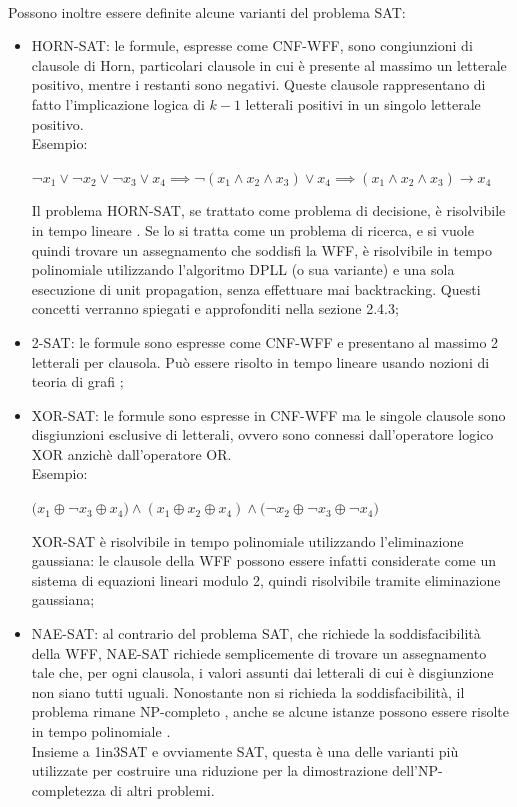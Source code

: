 \\
Possono inoltre essere definite alcune varianti del problema SAT:
\begin{itemize}
    \item HORN-SAT: le formule, espresse come CNF-WFF, sono congiunzioni di clausole di Horn, particolari clausole
    in cui è presente al massimo un letterale positivo, mentre i restanti sono negativi.
    Queste clausole rappresentano di fatto l'implicazione logica di $k-1$ letterali positivi in un singolo letterale positivo.\\
    Esempio:
    \begin{center}
        ¬$x_1 \lor $¬$x_2 \lor $¬$x_3 \lor x_4 \implies $¬$(x_1 \land x_2 \land x_3) \lor x_4 \implies (x_1 \land x_2 \land x_3) \rightarrow x_4$
    \end{center}
    Il problema HORN-SAT, se trattato come problema di decisione, è risolvibile in tempo lineare \cite{linear-hornsat}. Se lo si 
    tratta come un problema di ricerca, e si vuole quindi trovare un assegnamento che soddisfi la WFF, è risolvibile
    in tempo polinomiale utilizzando l'algoritmo DPLL \cite{algo-dpll} (o sua variante) e una sola esecuzione di unit propagation, senza effettuare mai backtracking. Questi concetti verranno spiegati e approfonditi nella sezione 2.4.3;
    \item 2-SAT: le formule sono espresse come CNF-WFF e presentano al massimo 2 letterali per clausola.
    Può essere risolto in tempo lineare usando nozioni di teoria di grafi \cite{2sat-algo};
    \item XOR-SAT: le formule sono espresse in CNF-WFF ma le singole clausole sono disgiunzioni esclusive di letterali, 
    ovvero sono connessi dall'operatore logico XOR anzichè dall'operatore OR.\\
    Esempio:
    \begin{center}
        $(x_1 \oplus $¬$x_3 \oplus x_4) \land (x_1 \oplus x_2 \oplus x_4) \land ($¬$x_2 \oplus $¬$x_3 \oplus $¬$x_4)$
    \end{center}
    XOR-SAT è risolvibile in tempo polinomiale utilizzando l'eliminazione gaussiana: le clausole della WFF possono essere infatti
    considerate come un sistema di equazioni lineari modulo 2, quindi risolvibile tramite eliminazione gaussiana;
    \item NAE-SAT: al contrario del problema SAT, che richiede la soddisfacibilità della WFF, NAE-SAT richiede semplicemente
    di trovare un assegnamento tale che, per ogni clausola, i valori assunti dai letterali di cui è disgiunzione non siano tutti uguali.
    Nonostante non si richieda la soddisfacibilità, il problema rimane NP-completo \cite{dichotomy-theorem}, anche se alcune istanze possono 
    essere risolte in tempo polinomiale \cite{planar-nae3sat}.\\
    Insieme a 1in3SAT e ovviamente SAT, questa è una delle varianti più utilizzate per costruire una riduzione per la dimostrazione
    dell'NP-completezza di altri problemi.
\end{itemize}
